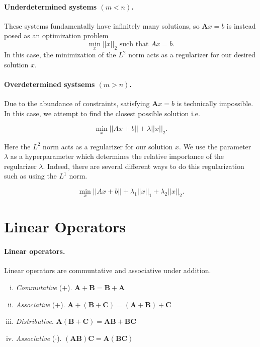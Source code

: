 \documentclass[12pt]{article}
\newcommand{\norm}[1]{ \left|\left| #1 \right|\right| }
\renewcommand{\vec}[1]{\mathbf{#1}}
\theoremstyle{definition}
\theoremstyle{remark}
\numberwithin{equation}{section}
\begin{document}

\paragraph{Underdetermined systems $(m < n)$.}

These systems fundamentally have infinitely many solutions, so $\vec{A}x=b$ is instead posed as an optimization problem
\begin{equation}
  \min_x \norm{x}_2 \text{ such that } Ax = b.
\end{equation}
In this case, the minimization of the $L^2$ norm acts as a regularizer for our desired solution $x$.

\paragraph{Overdetermined systsems $(m>n)$.}

Due to the abundance of constraints, satisfying $\vec{A}x=b$ is technically impossible. In this case, we attempt to find the closest possible solution i.e.

\begin{equation}
  \min_x \norm{Ax + b} + \lambda \norm{x}_2.
\end{equation}

Here the $L^2$ norm acts as a regularizer for our solution $x$. We use the parameter $\lambda$ as a hyperparameter which determines the relative importance of the regularizer $\lambda$. Indeed, there are several different ways to do this regularization such as using the $L^1$ norm.

\begin{equation}
  \min_x \norm{Ax + b} + \lambda_1 \norm{x}_1 + \lambda_2 \norm{x}_2.
\end{equation}



\section{Linear Operators}%
\label{sec:linear_operators}

\paragraph{Linear operators.}%
\label{par:linear_operators}

Linear operators are communtative and associative under addition.
\begin{enumerate}[(i)]
  \item \emph{Commutative} ($+$). $\vec{A} + \vec{B} = \vec{B} + \vec{A}$
  \item \emph{Associative} ($+$). $\vec{A} + (\vec{B} + \vec{C}) = (\vec{A} + \vec{B}) + \vec{C}$
  \item \emph{Distributive}. $\vec{A}(\vec{B} + \vec{C}) = \vec{AB} + \vec{BC}$
  \item \emph{Associative} ($\cdot$). $(\vec{AB})\vec{C} = \vec{A}(\vec{BC})$
\end{enumerate}
\end{document}
